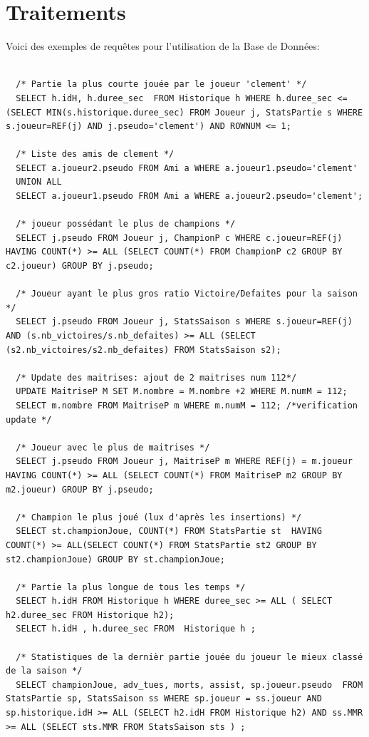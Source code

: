 \documentclass[a4paper,10pt]{report}
\begin{document}
\section{Traitements}
Voici des exemples de requêtes pour l'utilisation de la Base de Données:
\begin{lstlisting}

  /* Partie la plus courte jouée par le joueur 'clement' */
  SELECT h.idH, h.duree_sec  FROM Historique h WHERE h.duree_sec <= (SELECT MIN(s.historique.duree_sec) FROM Joueur j, StatsPartie s WHERE s.joueur=REF(j) AND j.pseudo='clement') AND ROWNUM <= 1;

  /* Liste des amis de clement */
  SELECT a.joueur2.pseudo FROM Ami a WHERE a.joueur1.pseudo='clement'
  UNION ALL
  SELECT a.joueur1.pseudo FROM Ami a WHERE a.joueur2.pseudo='clement';

  /* joueur possédant le plus de champions */
  SELECT j.pseudo FROM Joueur j, ChampionP c WHERE c.joueur=REF(j) HAVING COUNT(*) >= ALL (SELECT COUNT(*) FROM ChampionP c2 GROUP BY c2.joueur) GROUP BY j.pseudo;

  /* Joueur ayant le plus gros ratio Victoire/Defaites pour la saison */
  SELECT j.pseudo FROM Joueur j, StatsSaison s WHERE s.joueur=REF(j) AND (s.nb_victoires/s.nb_defaites) >= ALL (SELECT (s2.nb_victoires/s2.nb_defaites) FROM StatsSaison s2);

  /* Update des maitrises: ajout de 2 maitrises num 112*/
  UPDATE MaitriseP M SET M.nombre = M.nombre +2 WHERE M.numM = 112;
  SELECT m.nombre FROM MaitriseP m WHERE m.numM = 112; /*verification update */

  /* Joueur avec le plus de maitrises */
  SELECT j.pseudo FROM Joueur j, MaitriseP m WHERE REF(j) = m.joueur  HAVING COUNT(*) >= ALL (SELECT COUNT(*) FROM MaitriseP m2 GROUP BY m2.joueur) GROUP BY j.pseudo;

  /* Champion le plus joué (lux d'après les insertions) */
  SELECT st.championJoue, COUNT(*) FROM StatsPartie st  HAVING COUNT(*) >= ALL(SELECT COUNT(*) FROM StatsPartie st2 GROUP BY st2.championJoue) GROUP BY st.championJoue;

  /* Partie la plus longue de tous les temps */
  SELECT h.idH FROM Historique h WHERE duree_sec >= ALL ( SELECT h2.duree_sec FROM Historique h2);
  SELECT h.idH , h.duree_sec FROM  Historique h ;

  /* Statistiques de la dernièr partie jouée du joueur le mieux classé de la saison */
  SELECT championJoue, adv_tues, morts, assist, sp.joueur.pseudo  FROM StatsPartie sp, StatsSaison ss WHERE sp.joueur = ss.joueur AND sp.historique.idH >= ALL (SELECT h2.idH FROM Historique h2) AND ss.MMR >= ALL (SELECT sts.MMR FROM StatsSaison sts ) ;


\end{lstlisting}
\end{document}
